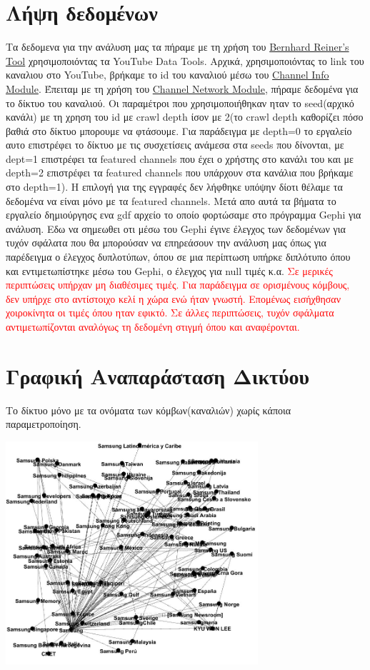 \documentclass[12pt]{article}
\begin{document}
	\section{Λήψη δεδομένων}
	Τα δεδομενα για την ανάλυση μας τα πήραμε με τη χρήση του \href{https://labs.polsys.net}{Bernhard Reiner's Tool} χρησιμοποιόντας τα YouTube Data Tools. Αρχικά, χρησιμοποιόντας το link του καναλιου στο YouTube, βρήκαμε το id του καναλιού μέσω του  \href{https://ytdt.digitalmethods.net/mod_channel_info.php}{Channel Info Module}. Έπειταμ με τη χρήση του \href{https://ytdt.digitalmethods.net/mod_channel_info.php}{Channel Network Module}, πήραμε δεδομένα για το δίκτυο του καναλιού. Οι παραμέτροι που χρησιμοποιήθηκαν ηταν το seed(αρχικό κανάλι) με τη χρηση του id με crawl depth ίσον με 2(το crawl depth καθορίζει πόσο βαθιά στο δίκτυο μπορουμε να φτάσουμε. Για παράδειγμα με depth=0 το εργαλείο αυτο επιστρέφει το δίκτυο με τις συσχετίσεις ανάμεσα στα seeds που δίνονται, με dept=1 επιστρέφει τα featured channels που έχει ο χρήστης στο κανάλι του και με depth=2 επιστρέφει τα featured channels που υπάρχουν στα κανάλια που βρήκαμε στο depth=1). Η επιλογή για της εγγραφές δεν λήφθηκε υπόψην δίοτι θέλαμε τα δεδομένα να είναι μόνο με τα featured channels. Μετά απο αυτά τα βήματα το εργαλείο δημιούργησς ενα gdf αρχείο το οποίο φορτώσαμε στο πρόγραμμα Gephi για ανάλυση. Εδω να σημεωθει οτι μέσω του Gephi έγινε έλεγχος των δεδομένων για τυχόν σφάλατα που θα μπορούσαν να επηρεάσουν την ανάλυση μας όπως για παρέδειγμα ο έλεγχος δυπλοτύπων, όπου σε μια περίπτωση υπήρκε διπλότυπο όπου και εντιμετωπίστηκε μέσω του Gephi, ο έλεγχος για null τιμές κ.α. \textcolor{red}{Σε μερικές περιπτώσεις υπήρχαν μη διαθέσιμες τιμές. Για παράδειγμα σε ορισμένους κόμβους, δεν υπήρχε στο αντίστοιχο κελί η χώρα ενώ ήταν γνωστή. Επομένως εισήχθησαν χοιροκίνητα οι τιμές όπου ηταν εφικτό. Σε άλλες περιπτώσεις, τυχόν σφάλματα αντιμετωπίζονται αναλόγως τη δεδομένη στιγμή όπου και αναφέρονται.}
	\label{chap:data_fetching_2}
	
	
	\section{Γραφική Αναπαράσταση Δικτύου}
	Το δίκτυο μόνο με τα ονόματα των κόμβων(καναλιών) χωρίς κάποια παραμετροποίηση.
		\begin{center}
			\includegraphics[width=0.7\textwidth]{photos-files/section3/first_painting.jpg}
		\end{center}
	\newpage
	
\end{document}

